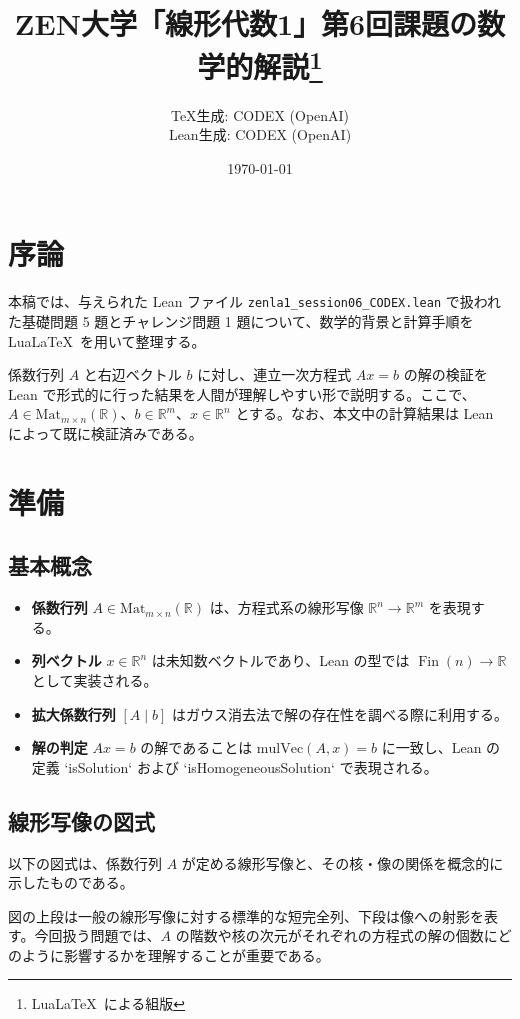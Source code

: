 \documentclass[a4paper]{ltjsarticle}
\title{ZEN大学「線形代数1」第6回課題の数学的解説\thanks{Lua\LaTeX\ による組版}}
\author{TeX生成: CODEX (OpenAI)\\Lean生成: CODEX (OpenAI)}
\date{\today}
\begin{document}
\maketitle

\tableofcontents

\section{序論}
本稿では、与えられた Lean ファイル \texttt{zenla1\_session06\_CODEX.lean} で扱われた基礎問題 5 題とチャレンジ問題 1 題について、数学的背景と計算手順を Lua\LaTeX\ を用いて整理する。\par
係数行列 $A$ と右辺ベクトル $b$ に対し、連立一次方程式 $A x = b$ の解の検証を Lean で形式的に行った結果を人間が理解しやすい形で説明する。ここで、$A \in \mathrm{Mat}_{m \times n}(\mathbb{R})$、$b \in \mathbb{R}^m$、$x \in \mathbb{R}^n$ とする。なお、本文中の計算結果は Lean によって既に検証済みである。

\section{準備}
\subsection{基本概念}
\begin{itemize}
  \item \textbf{係数行列} $A \in \mathrm{Mat}_{m \times n}(\mathbb{R})$ は、方程式系の線形写像 $\mathbb{R}^n \to \mathbb{R}^m$ を表現する。
  \item \textbf{列ベクトル} $x \in \mathbb{R}^n$ は未知数ベクトルであり、Lean の型では $\operatorname{Fin}(n) \to \mathbb{R}$ として実装される。
  \item \textbf{拡大係数行列} $[A\mid b]$ はガウス消去法で解の存在性を調べる際に利用する。
  \item \textbf{解の判定} $A x = b$ の解であることは $\mathrm{mulVec}(A, x) = b$ に一致し、Lean の定義 `isSolution` および `isHomogeneousSolution` で表現される。
\end{itemize}

\subsection{線形写像の図式}
以下の図式は、係数行列 $A$ が定める線形写像と、その核・像の関係を概念的に示したものである。
\begin{center}
\end{center}
図の上段は一般の線形写像に対する標準的な短完全列、下段は像への射影を表す。今回扱う問題では、$A$ の階数や核の次元がそれぞれの方程式の解の個数にどのように影響するかを理解することが重要である。
\end{document}
